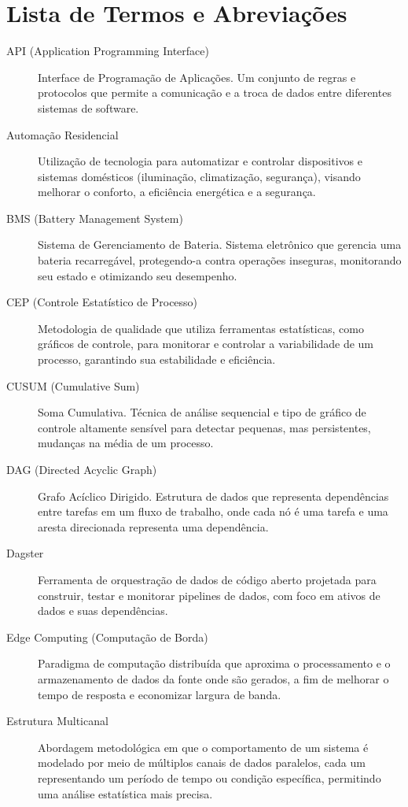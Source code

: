 \chapter*{Lista de Termos e Abreviações}

\begin{description}
    \item[API (Application Programming Interface)] Interface de Programação de Aplicações. Um conjunto de regras e protocolos que permite a comunicação e a troca de dados entre diferentes sistemas de software.
    \item[Automação Residencial] Utilização de tecnologia para automatizar e controlar dispositivos e sistemas domésticos (iluminação, climatização, segurança), visando melhorar o conforto, a eficiência energética e a segurança.
    \item[BMS (Battery Management System)] Sistema de Gerenciamento de Bateria. Sistema eletrônico que gerencia uma bateria recarregável, protegendo-a contra operações inseguras, monitorando seu estado e otimizando seu desempenho.
    \item[CEP (Controle Estatístico de Processo)] Metodologia de qualidade que utiliza ferramentas estatísticas, como gráficos de controle, para monitorar e controlar a variabilidade de um processo, garantindo sua estabilidade e eficiência.
    \item[CUSUM (Cumulative Sum)] Soma Cumulativa. Técnica de análise sequencial e tipo de gráfico de controle altamente sensível para detectar pequenas, mas persistentes, mudanças na média de um processo.
    \item[DAG (Directed Acyclic Graph)] Grafo Acíclico Dirigido. Estrutura de dados que representa dependências entre tarefas em um fluxo de trabalho, onde cada nó é uma tarefa e uma aresta direcionada representa uma dependência.
    \item[Dagster] Ferramenta de orquestração de dados de código aberto projetada para construir, testar e monitorar pipelines de dados, com foco em ativos de dados e suas dependências.
    \item[Edge Computing (Computação de Borda)] Paradigma de computação distribuída que aproxima o processamento e o armazenamento de dados da fonte onde são gerados, a fim de melhorar o tempo de resposta e economizar largura de banda.
    \item[Estrutura Multicanal] Abordagem metodológica em que o comportamento de um sistema é modelado por meio de múltiplos canais de dados paralelos, cada um representando um período de tempo ou condição específica, permitindo uma análise estatística mais precisa.

\end{description}
